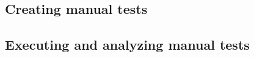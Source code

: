 \subsection{Creating manual tests}
\label{TasksManualCreate}


\subsection{Executing and analyzing manual tests}
\label{TasksManualExec}

